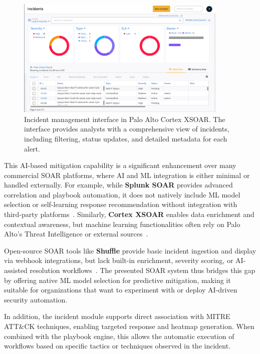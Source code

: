 \begin{figure}[ht]
    \centering
    \includegraphics[width=0.9\textwidth]{images/xsoar_incidents.png}
    \caption[Incident management interface in Palo Alto Cortex XSOAR]{Incident management interface in Palo Alto Cortex XSOAR. The interface provides analysts with a comprehensive view of incidents, including filtering, status updates, and detailed metadata for each alert.}
    \label{fig:xsoar-incidents}
\end{figure}

This AI-based mitigation capability is a significant enhancement over many commercial SOAR platforms, where AI and ML integration is either minimal or handled externally. For example, while \textbf{Splunk SOAR} provides advanced correlation and playbook automation, it does not natively include ML model selection or self-learning response recommendation without integration with third-party platforms~\cite{splunk}. Similarly, \textbf{Cortex XSOAR} enables data enrichment and contextual awareness, but machine learning functionalities often rely on Palo Alto’s Threat Intelligence or external sources~\cite{paloalto}.

Open-source SOAR tools like \textbf{Shuffle} provide basic incident ingestion and display via webhook integrations, but lack built-in enrichment, severity scoring, or AI-assisted resolution workflows~\cite{techtarget}. The presented SOAR system thus bridges this gap by offering native ML model selection for predictive mitigation, making it suitable for organizations that want to experiment with or deploy AI-driven security automation.

In addition, the incident module supports direct association with MITRE ATT\&CK techniques, enabling targeted response and heatmap generation. When combined with the playbook engine, this allows the automatic execution of workflows based on specific tactics or techniques observed in the incident.

